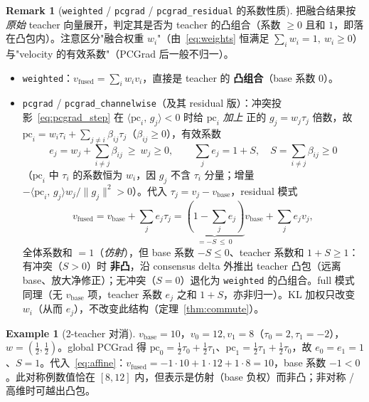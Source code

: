 \documentclass[11pt,a4paper]{article}
\newcommand{\vb}{v_{\mathrm{base}}}
\newcommand{\vfused}{v_{\mathrm{fused}}}
\newcommand{\inner}[2]{\langle #1,\, #2\rangle}
\newcommand{\norm}[1]{\lVert #1\rVert}
\theoremstyle{plain}
\theoremstyle{definition}
\newtheorem{remark}{Remark}
\newtheorem{example}{Example}
\begin{document}
\begin{remark}[\texttt{weighted} / \texttt{pcgrad} / \texttt{pcgrad\_residual} 的系数性质]
\label{rem:coeff_pcgrad}
把融合结果按 \emph{原始} teacher 向量展开，判定其是否为 teacher 的凸组合（系数 $\ge0$ 且和 $1$，即落在凸包内）。注意区分"融合权重 $w_i$"（由~\eqref{eq:weights} 恒满足 $\sum_i w_i=1,\ w_i\ge0$）与"velocity 的有效系数"（PCGrad 后一般不归一）。
\begin{itemize}[leftmargin=1.6em]
\item \texttt{weighted}：$\vfused=\sum_i w_i v_i$，直接是 teacher 的 \textbf{凸组合}（base 系数 $0$）。
\item \texttt{pcgrad} / \texttt{pcgrad\_channelwise}（及其 residual 版）：冲突投影~\eqref{eq:pcgrad_step} 在 $\inner{\mathrm{pc}_i}{g_j}<0$ 时给 $\mathrm{pc}_i$ \emph{加上} 正的 $g_j=w_j\tau_j$ 倍数，故 $\mathrm{pc}_i=w_i\tau_i+\sum_{j\neq i}\beta_{ij}\tau_j$（$\beta_{ij}\ge0$），有效系数
\[
e_j=w_j+\sum_{i\neq j}\beta_{ij}\ \ge\ w_j\ge0,\qquad \sum_j e_j=1+S,\quad S=\textstyle\sum_{i\neq j}\beta_{ij}\ge0
\]
（$\mathrm{pc}_i$ 中 $\tau_i$ 的系数恒为 $w_i$，因 $g_j$ 不含 $\tau_i$ 分量；增量 $-\inner{\mathrm{pc}_i}{g_j}w_j/\norm{g_j}^2>0$）。代入 $\tau_j=v_j-\vb$，residual 模式
\begin{equation}
\vfused=\vb+\sum_j e_j\tau_j=\underbrace{(1-\textstyle\sum_j e_j)}_{=-S\ \le\ 0}\vb+\sum_j e_j v_j,
\label{eq:affine}
\end{equation}
全体系数和 $=1$（\emph{仿射}），但 base 系数 $-S\le0$、teacher 系数和 $1+S\ge1$：有冲突（$S>0$）时 \textbf{非凸}，沿 consensus delta 外推出 teacher 凸包（远离 base、放大净修正）；无冲突（$S=0$）退化为 \texttt{weighted} 的凸组合。full 模式同理（无 $\vb$ 项，teacher 系数 $e_j$ 之和 $1+S$，亦非归一）。KL 加权只改变 $w_i$（从而 $e_j$），不改变此结构（定理~\ref{thm:commute}）。
\end{itemize}
\end{remark}

\begin{example}[2-teacher 对消]
\label{ex:cancel}
$\vb=10$，$v_0=12,v_1=8$（$\tau_0=2,\tau_1=-2$），$w=(\tfrac12,\tfrac12)$。global PCGrad 得 $\mathrm{pc}_0=\tfrac12\tau_0+\tfrac12\tau_1$、$\mathrm{pc}_1=\tfrac12\tau_1+\tfrac12\tau_0$，故 $e_0=e_1=1$、$S=1$。代入~\eqref{eq:affine}：$\vfused=-1\cdot10+1\cdot12+1\cdot8=10$，base 系数 $-1<0$。此对称例数值恰在 $[8,12]$ 内，但表示是仿射（base 负权）而非凸；非对称 / 高维时可越出凸包。
\end{example}
\end{document}
